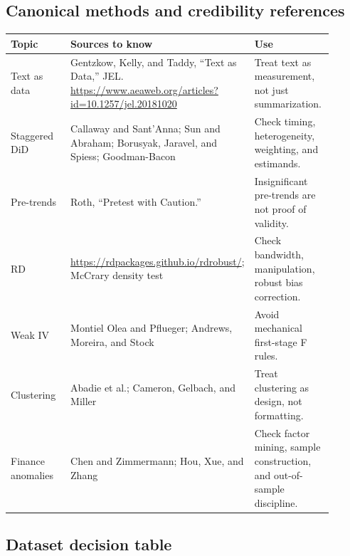 \documentclass[11pt]{article}
\begin{document}
\subsection{Canonical methods and credibility references}

\begin{longtable}{p{0.20\linewidth}p{0.45\linewidth}p{0.25\linewidth}}
\toprule
\textbf{Topic} & \textbf{Sources to know} & \textbf{Use}\\
\midrule
Text as data & Gentzkow, Kelly, and Taddy, ``Text as Data,'' JEL. \url{https://www.aeaweb.org/articles?id=10.1257/jel.20181020} & Treat text as measurement, not just summarization.\\
Staggered DiD & Callaway and Sant'Anna; Sun and Abraham; Borusyak, Jaravel, and Spiess; Goodman-Bacon & Check timing, heterogeneity, weighting, and estimands.\\
Pre-trends & Roth, ``Pretest with Caution.'' & Insignificant pre-trends are not proof of validity.\\
RD & \url{https://rdpackages.github.io/rdrobust/}; McCrary density test & Check bandwidth, manipulation, robust bias correction.\\
Weak IV & Montiel Olea and Pflueger; Andrews, Moreira, and Stock & Avoid mechanical first-stage F rules.\\
Clustering & Abadie et al.; Cameron, Gelbach, and Miller & Treat clustering as design, not formatting.\\
Finance anomalies & Chen and Zimmermann; Hou, Xue, and Zhang & Check factor mining, sample construction, and out-of-sample discipline.\\
\bottomrule
\end{longtable}

\subsection{Dataset decision table}
\end{document}
